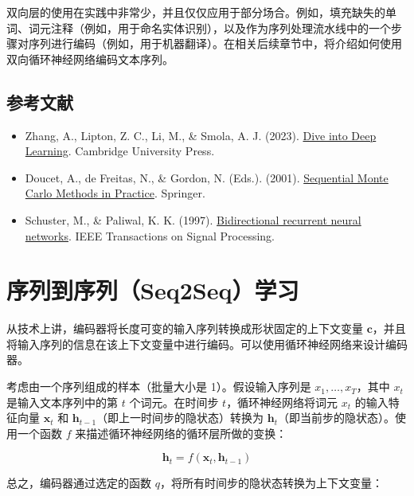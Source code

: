 双向层的使用在实践中非常少，并且仅仅应用于部分场合。例如，填充缺失的单词、词元注释（例如，用于命名实体识别），以及作为序列处理流水线中的一个步骤对序列进行编码（例如，用于机器翻译）。在相关后续章节中，将介绍如何使用双向循环神经网络编码文本序列。

\hypertarget{ux53c2ux8003ux6587ux732e-23}{%
\subsection{参考文献}\label{ux53c2ux8003ux6587ux732e-23}}

\vspace{0.25em}
\begin{itemize}
\tightlist
\item
  Zhang, A., Lipton, Z. C., Li, M., \& Smola, A. J. (2023). \href{https://D2L.ai}{Dive into Deep Learning}. Cambridge University Press.
\item
  Doucet, A., de Freitas, N., \& Gordon, N. (Eds.). (2001). \href{https://doi.org/10.1007/978-1-4757-3437-9}{Sequential Monte Carlo Methods in Practice}. Springer.
\item
  Schuster, M., \& Paliwal, K. K. (1997). \href{https://doi.org/10.1109/78.650093}{Bidirectional recurrent neural networks}. IEEE Transactions on Signal Processing.
\end{itemize}

\clearpage

\hypertarget{ux5e8fux5217ux5230ux5e8fux5217seq2sequx5b66ux4e60}{%
\section{序列到序列（Seq2Seq）学习}\label{ux5e8fux5217ux5230ux5e8fux5217seq2sequx5b66ux4e60}}

从技术上讲，编码器将长度可变的输入序列转换成形状固定的上下文变量 \(\mathbf{c}\)，并且将输入序列的信息在该上下文变量中进行编码。可以使用循环神经网络来设计编码器。

考虑由一个序列组成的样本（批量大小是 1）。假设输入序列是 \(x_1,\ldots,x_T\)，其中 \(x_t\) 是输入文本序列中的第 \(t\) 个词元。在时间步 \(t\)，循环神经网络将词元 \(x_t\) 的输入特征向量 \(\mathbf{x}_t\) 和 \(\mathbf{h}_{t-1}\)（即上一时间步的隐状态）转换为 \(\mathbf{h}_t\)（即当前步的隐状态）。使用一个函数 \(f\) 来描述循环神经网络的循环层所做的变换：

\[
\mathbf{h}_t = f(\mathbf{x}_t,\mathbf{h}_{t-1})
\]

总之，编码器通过选定的函数 \(q\)，将所有时间步的隐状态转换为上下文变量：

